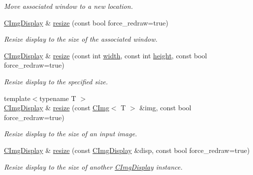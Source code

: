 \begin{DoxyCompactItemize}
\begin{DoxyCompactList}\small\item\em Move associated window to a new location. \end{DoxyCompactList}\item 
\hyperlink{structcimg__library__suffixed_1_1CImgDisplay}{C\+Img\+Display} \& \hyperlink{structcimg__library__suffixed_1_1CImgDisplay_a35a57d0053db927961c5d3a12918055a}{resize} (const bool force\+\_\+redraw=true)
\begin{DoxyCompactList}\small\item\em Resize display to the size of the associated window. \end{DoxyCompactList}\item 
\hyperlink{structcimg__library__suffixed_1_1CImgDisplay}{C\+Img\+Display} \& \hyperlink{structcimg__library__suffixed_1_1CImgDisplay_addf4e29782b6cb1273b880743d639c0c}{resize} (const int \hyperlink{structcimg__library__suffixed_1_1CImgDisplay_a7b08f09ace9b615eee0ff19846c4b6f8}{width}, const int \hyperlink{structcimg__library__suffixed_1_1CImgDisplay_a5604a6886d51d1070ed2ddc568a848f2}{height}, const bool force\+\_\+redraw=true)
\begin{DoxyCompactList}\small\item\em Resize display to the specified size. \end{DoxyCompactList}\item 
{\footnotesize template$<$typename T $>$ }\\\hyperlink{structcimg__library__suffixed_1_1CImgDisplay}{C\+Img\+Display} \& \hyperlink{structcimg__library__suffixed_1_1CImgDisplay_a1e0620dcddd939fc81d807b7edd61b90}{resize} (const \hyperlink{structcimg__library__suffixed_1_1CImg}{C\+Img}$<$ T $>$ \&img, const bool force\+\_\+redraw=true)
\begin{DoxyCompactList}\small\item\em Resize display to the size of an input image. \end{DoxyCompactList}\item 
\hyperlink{structcimg__library__suffixed_1_1CImgDisplay}{C\+Img\+Display} \& \hyperlink{structcimg__library__suffixed_1_1CImgDisplay_a1da38da8b6517995ebd493d6bcca52ca}{resize} (const \hyperlink{structcimg__library__suffixed_1_1CImgDisplay}{C\+Img\+Display} \&disp, const bool force\+\_\+redraw=true)
\begin{DoxyCompactList}\small\item\em Resize display to the size of another \hyperlink{structcimg__library__suffixed_1_1CImgDisplay}{C\+Img\+Display} instance. \end{DoxyCompactList}\item 

\end{DoxyCompactItemize}
